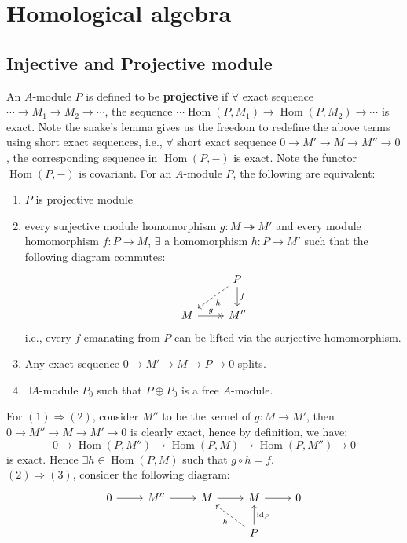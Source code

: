\documentclass[12pt]{article}
\theoremstyle{definition}
\theoremstyle{plain}
\DeclareMathOperator{\id}{id}
\DeclareMathOperator{\Hom}{Hom}
\newcommand{\surj}{\twoheadrightarrow}
\begin{document}
\pagebreak
\section{Homological algebra}
\subsection{Injective and Projective module}
\Def An $A$-module $P$ is defined to be \textbf{projective} if $\forall$ exact sequence $\cdots\to M_1\to M_2\to \cdots$, the sequence $\cdots\Hom(P, M_1)\to \Hom(P, M_2)\to \cdots$ is exact.
\Rmk Note the snake's lemma gives us the freedom to redefine the above terms using short exact sequences, i.e., $\forall$ short exact sequence $0\to M'\to M\to M''\to 0$, the corresponding sequence in $\Hom(P, -)$ is exact. Note the functor $\Hom(P,-)$ is covariant.
 For an $A$-module $P$, the following are equivalent:
\begin{enumerate}
  \item $P$ is projective module
  \item every surjective module homomorphism $g:M\surj M'$ and every module homomorphism $f: P \to M$, $\exists$ a homomorphism $h : P \to M' $ such that the following diagram commutes:
      \begin{equation}
        \begin{tikzcd}
          & P\ar[dashed]{ld}{h}\ar{d}{f}\\
          M\ar[->>]{r}{g} &M''
        \end{tikzcd}
      \end{equation}
      i.e., every $f$ emanating from $P$ can be lifted via the surjective homomorphism.
  \item Any exact sequence $0\to M'\to M\to P\to 0$ splits.
  \item $\exists A$-module $P_0$ such that $P\oplus P_0$ is a free $A$-module.
\end{enumerate}
\proof For $(1)\Rightarrow (2)$, consider $M''$ to be the kernel of $g:M\to M'$, then $0\to M''\to M\to M'\to 0$ is clearly exact, hence by definition, we have:
$$0\to \Hom(P, M'')\to \Hom(P, M) \to \Hom(P, M'')\to 0$$
is exact. Hence $\exists h\in \Hom(P, M)$ such that $g\circ h=f$.\\
$(2)\Rightarrow (3)$, consider the following diagram:
\begin{equation}
  \begin{tikzcd}
    0\ar{r} &M''\ar{r} &M \ar{r} &M\ar{r} &0 \\
    & & &P\ar[dashed]{lu}{h}\ar{u}[swap]{\id_P}
  \end{tikzcd}
\end{equation}
\end{document}
